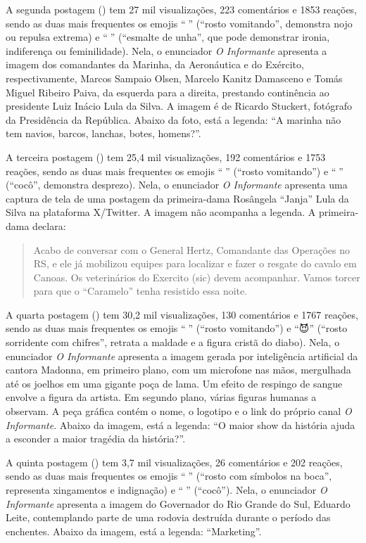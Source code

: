 \documentclass[portuguese]{textolivre}
\begin{document}
A segunda postagem () tem 27 mil visualizações, 223 comentários e 1853 reações, sendo as duas mais frequentes os emojis ``{\Symbola 🤮}'' (``rosto vomitando'', demonstra nojo ou repulsa extrema) e ``{\Symbola 💅}'' (``esmalte de unha'', que pode demonstrar ironia, indiferença ou feminilidade). Nela, o enunciador \emph{O Informante} apresenta a imagem dos comandantes da Marinha, da Aeronáutica e do Exército, respectivamente, Marcos Sampaio Olsen, Marcelo Kanitz Damasceno e Tomás Miguel Ribeiro Paiva, da esquerda para a direita, prestando continência ao presidente Luiz Inácio Lula da Silva. A imagem é de Ricardo Stuckert, fotógrafo da Presidência da República. Abaixo da foto, está a legenda: ``A marinha não tem navios, barcos, lanchas, botes, homens?''.

A terceira postagem () tem 25,4 mil visualizações, 192 comentários e 1753 reações, sendo as duas mais frequentes os emojis ``{\Symbola 🤮}'' (``rosto vomitando'') e ``{\Symbola 💩}'' (``cocô'', demonstra desprezo). Nela, o enunciador \emph{O Informante} apresenta uma captura de tela de uma postagem da primeira-dama Rosângela ``Janja'' Lula da Silva na plataforma X/Twitter. A imagem não acompanha a legenda. A primeira-dama declara:

\begin{quote}
    Acabo de conversar com o General Hertz, Comandante das Operações no RS, e ele já mobilizou equipes para localizar e fazer o resgate do cavalo em Canoas. Os veterinários do Exercito (sic) devem acompanhar. Vamos torcer para que o ``Caramelo'' tenha resistido essa noite. {\Symbola 🙏}
\end{quote}

A quarta postagem () tem 30,2 mil visualizações, 130 comentários e 1767 reações, sendo as duas mais frequentes os emojis ``{\Symbola 🤮}'' (``rosto vomitando'') e ``{\Symbola 😈}'' (``rosto sorridente com chifres'', retrata a maldade e a figura cristã do diabo). Nela, o enunciador \emph{O Informante} apresenta a imagem gerada por inteligência artificial da cantora Madonna, em primeiro plano, com um microfone nas mãos, mergulhada até os joelhos em uma gigante poça de lama. Um efeito de respingo de sangue envolve a figura da artista. Em segundo plano, várias figuras humanas a observam. A peça gráfica contém o nome, o logotipo e o link do próprio canal \emph{O Informante}. Abaixo da imagem, está a legenda: ``O maior show da história ajuda a esconder a maior tragédia da história?''.

A quinta postagem () tem 3,7 mil visualizações, 26 comentários e 202 reações, sendo as duas mais frequentes os emojis ``{\Symbola 🤬}'' (``rosto com símbolos na boca'', representa xingamentos e indignação) e ``{\Symbola 💩}'' (``cocô''). Nela, o enunciador \emph{O Informante} apresenta a imagem do Governador do Rio Grande do Sul, Eduardo Leite, contemplando parte de uma rodovia destruída durante o período das enchentes. Abaixo da imagem, está a legenda: ``Marketing''.
\end{document}
